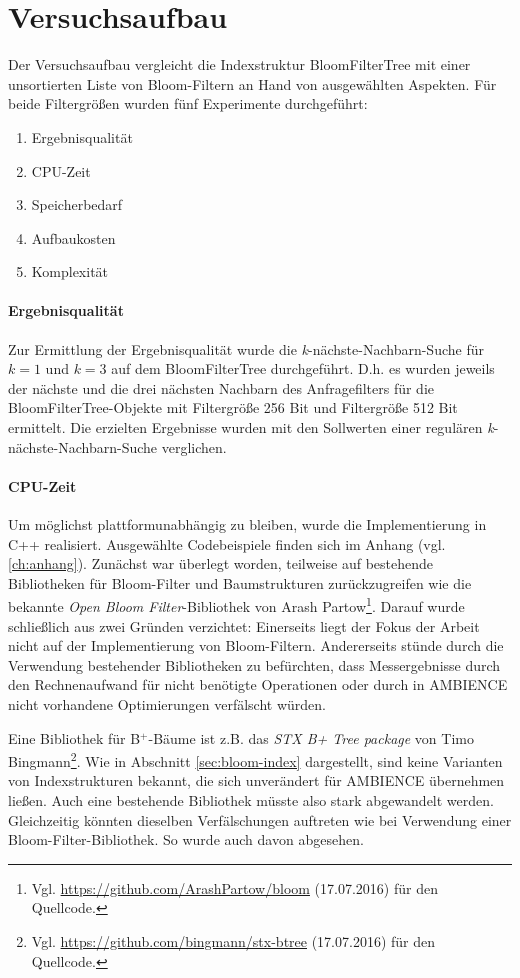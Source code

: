 \section{Versuchsaufbau}\label{sec:versuchsaufbau}
Der Versuchsaufbau vergleicht die Indexstruktur BloomFilterTree mit einer unsortierten Liste von Bloom-Filtern an Hand von ausgewählten Aspekten. Für beide Filtergrößen wurden fünf Experimente durchgeführt:  
\begin{enumerate}
\setlength{\itemsep}{20pt}
	\item Ergebnisqualität
	\item CPU-Zeit 
	\item Speicherbedarf 
	\item Aufbaukosten
	\item Komplexität
\end{enumerate}
\paragraph*{Ergebnisqualität}
Zur Ermittlung der Ergebnisqualität wurde die \textit{k}-nächste-Nachbarn-Suche für $k=1$ und $k=3$ auf dem BloomFilterTree durchgeführt. D.h. es wurden jeweils der nächste und die drei nächsten Nachbarn des Anfragefilters für die BloomFilterTree-Objekte mit Filtergröße 256 Bit und Filtergröße 512 Bit ermittelt. Die erzielten Ergebnisse wurden mit den Sollwerten einer regulären \textit{k}-nächste-Nachbarn-Suche verglichen. 
\paragraph*{CPU-Zeit}
Um möglichst plattformunabhängig zu bleiben, wurde die Implementierung in C++ realisiert. Ausgewählte Codebeispiele finden sich im Anhang (vgl. \ref{ch:anhang}). Zunächst war überlegt worden, teilweise auf bestehende Bibliotheken für Bloom-Filter und Baumstrukturen zurückzugreifen wie die bekannte \textit{Open Bloom Filter}-Bibliothek von Arash Partow\footnote{Vgl. \url{https://github.com/ArashPartow/bloom} (17.07.2016) für den Quellcode.}. Darauf wurde schließlich aus zwei Gründen verzichtet: Einerseits liegt der Fokus der Arbeit nicht auf der Implementierung von Bloom-Filtern. Andererseits stünde durch die Verwendung bestehender Bibliotheken zu befürchten, dass Messergebnisse durch den Rechnenaufwand für nicht benötigte Operationen oder durch in AMBIENCE nicht vorhandene Optimierungen verfälscht würden. 

Eine Bibliothek für B$^+$-Bäume ist z.B. das \textit{STX B+ Tree package} von Timo Bingmann\footnote{Vgl. \url{https://github.com/bingmann/stx-btree} (17.07.2016) für den Quellcode.}. Wie in Abschnitt \ref{sec:bloom-index} dargestellt, sind keine Varianten von Indexstrukturen bekannt, die sich unverändert für AMBIENCE übernehmen ließen. Auch eine bestehende Bibliothek müsste also stark abgewandelt werden. Gleichzeitig könnten dieselben Verfälschungen auftreten wie bei Verwendung einer Bloom-Filter-Bibliothek. So wurde auch davon abgesehen.


